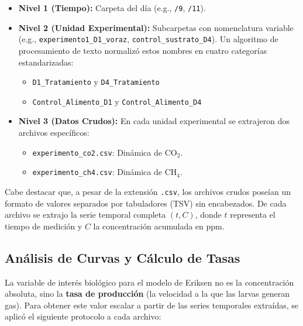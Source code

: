 \begin{itemize}
    \item \textbf{Nivel 1 (Tiempo):} Carpeta del día (e.g., \texttt{/9}, \texttt{/11}).
    \item \textbf{Nivel 2 (Unidad Experimental):} Subcarpetas con nomenclatura variable (e.g., \texttt{experimento1\_D1\_voraz}, \texttt{control\_sustrato\_D4}). Un algoritmo de procesamiento de texto normalizó estos nombres en cuatro categorías estandarizadas:
    \begin{itemize}
        \item \texttt{D1\_Tratamiento} y \texttt{D4\_Tratamiento}
        \item \texttt{Control\_Alimento\_D1} y \texttt{Control\_Alimento\_D4}
    \end{itemize}
    \item \textbf{Nivel 3 (Datos Crudos):} En cada unidad experimental se extrajeron dos archivos específicos:
    \begin{itemize}
        \item \texttt{experimento\_co2.csv}: Dinámica de CO$_2$.
        \item \texttt{experimento\_ch4.csv}: Dinámica de CH$_4$.
    \end{itemize}
\end{itemize}

Cabe destacar que, a pesar de la extensión \texttt{.csv}, los archivos crudos poseían un formato de valores separados por tabuladores (TSV) sin encabezados. De cada archivo se extrajo la serie temporal completa $(t, C)$, donde $t$ representa el tiempo de medición y $C$ la concentración acumulada en ppm.

\subsection{Análisis de Curvas y Cálculo de Tasas}
La variable de interés biológico para el modelo de Eriksen no es la concentración absoluta, sino la \textbf{tasa de producción} (la velocidad a la que las larvas generan gas). Para obtener este valor escalar a partir de las series temporales extraídas, se aplicó el siguiente protocolo a cada archivo:

